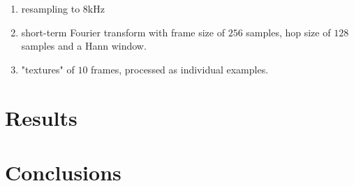 \documentclass[a0,portrait,20pt]{a0poster}
\begin{document}
\begin{multicols}{2}
\begin{enumerate}
  \item resampling to $8$kHz
  \item short-term Fourier transform with frame size of $256$ samples, hop size of $128$ samples and a Hann window.
  \item "textures" of $10$ frames, processed as individual examples.
\end{enumerate}









\color{SaddleBrown}


\color{DarkSlateGray} %

\section*{}


\section*{Results}



\color{SaddleBrown} %

\section*{Conclusions}



\color{DarkSlateGray} %


\end{multicols}
\end{document}
